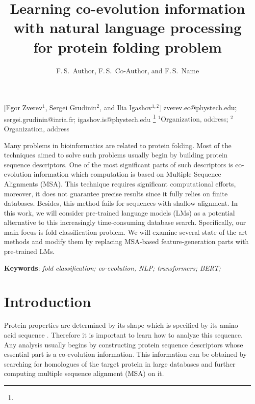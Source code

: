 \documentclass[12pt, twoside]{article}
\begin{document}
\English

\title
	[] %
    { Learning co-evolution information with natural language processing for protein folding problem} %
\author
	[F.\,S.~Author] %
	{F.\,S.~Author, F.\,S.~Co-Author, and F.\,S.~Name} %
    [Egor Zverev$^1$, Sergei Grudinin$^2$, and Ilia Igashov$^{1, 2}$] %
\email
    {zverev.eo@phystech.edu; sergei.grudinin@inria.fr; igashov.is@phystech.edu}
\thanks
    {}
\organization
    {$^1$Organization, address;
     $^2$Organization, address}
\abstract
    {Many problems in bioinformatics are related to protein folding. Most of the techniques aimed to solve such problems usually begin by building protein sequence descriptors. One of the most significant parts of such descriptors is co-evolution information which computation is based on Multiple Sequence Alignments (MSA). This technique requires significant computational efforts, moreover, it does not guarantee precise results since it fully relies on finite databases. Besides, this method fails for sequences with shallow alignment. In this work, we will consider pre-trained language models (LMs)  as a potential alternative to this increasingly time-consuming database search.  Specifically, our main focus is fold classification problem. We will examine several  state-of-the-art  methods  and  modify  them  by  replacing  MSA-based  feature-generation parts with pre-trained LMs.

		
	\noindent
    	\textbf{Keywords}: \emph{fold classification; co-evolution, NLP; transformers; BERT;  }}





\maketitle
\linenumbers

\section{Introduction}
\noindent %
Protein properties are determined by its shape which is specified by its amino acid sequence \cite{cellbiology}. Therefore it is important to learn how to analyze this sequence.
Any analysis usually begins by constructing protein sequence descriptors whose essential part is a co-evolution information. This information can be obtained by searching for homologues of the target protein in large databases and further computing multiple sequence alignment (MSA) on it. 
\end{document}
